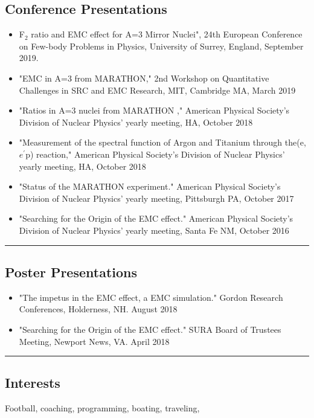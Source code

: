 \subsection*{Conference Presentations}
\begin{itemize}
\item F$_2$ ratio and EMC effect for A=3 Mirror Nuclei", 24th European Conference on Few-body Problems in Physics, University of Surrey, England, September 2019.
\item "EMC in A=3 from MARATHON," 2nd Workshop on Quantitative Challenges in SRC and EMC Research,  MIT, Cambridge MA,  March 2019
\item "Ratios in A=3 nuclei from MARATHON ," American Physical Society's Division of Nuclear Physics' yearly meeting, HA, October 2018
\item "Measurement of the spectral function of Argon and Titanium through the(e,$e^\prime$p) reaction," American Physical Society's Division of Nuclear Physics' yearly meeting, HA, October 2018
\item "Status of the MARATHON experiment." American Physical Society's Division of Nuclear Physics' yearly meeting, Pittsburgh PA, October 2017
\item "Searching for the Origin of the EMC effect." American Physical Society's Division of Nuclear Physics' yearly meeting, Santa Fe NM, October 2016
\end{itemize}

\hrule
\subsection*{Poster Presentations}
\begin{itemize}
\item "The impetus in the EMC effect, a EMC simulation." Gordon Research Conferences, Holderness, NH. August 2018 
\item "Searching for the Origin of the EMC effect." SURA Board of Trustees Meeting, Newport News, VA. April 2018 
\end{itemize}

\hrule

\subsection*{Interests}

Football, coaching, programming, boating, traveling,



